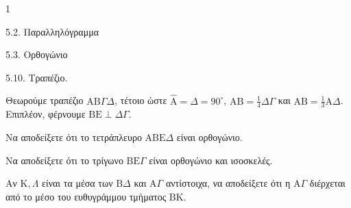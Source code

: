 \begin{ylh}{1}
    \item 5.2. Παραλληλόγραμμα
    \item 5.3. Ορθογώνιο
    \item 5.10. Τραπέζιο.
\end{ylh}
Θεωρούμε τραπέζιο $\mathrm{A}\mathrm{B}\Gamma\Delta$, τέτοιο ώστε $\hat{\mathrm{A}} = \hat{\Delta} = 90^\circ$, $\mathrm{A}\mathrm{B} = \frac{1}{4}\Delta\Gamma$ και $\mathrm{A}\mathrm{B} = \frac{1}{3}\mathrm{A}\Delta$. Επιπλέον, φέρνουμε $\mathrm{B}\mathrm{E} \perp \Delta\Gamma$.
\begin{alist}
    \item Να αποδείξετε ότι το τετράπλευρο $\mathrm{A}\mathrm{B}\mathrm{E}\Delta$ είναι ορθογώνιο. 
    \item Να αποδείξετε ότι το τρίγωνο $\mathrm{B}\mathrm{E}\Gamma$ είναι ορθογώνιο και ισοσκελές. 
    \item Αν $\mathrm{K}, \Lambda$ είναι τα μέσα των $\mathrm{B}\Delta$ και $\mathrm{A}\Gamma$ αντίστοιχα, να αποδείξετε ότι η $\mathrm{A}\Gamma$ διέρχεται από το μέσο του ευθυγράμμου τμήματος $\mathrm{B}\mathrm{K}$. 
\end{alist}
